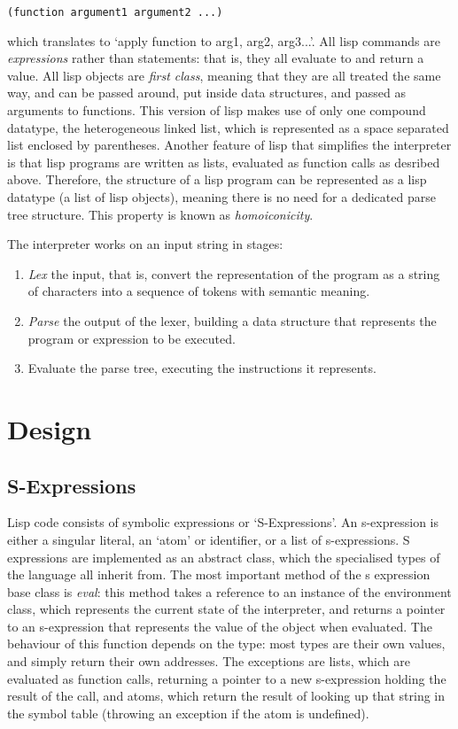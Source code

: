 \documentclass[12pt]{article}
\begin{document}
\begin{lstlisting}
(function argument1 argument2 ...)
\end{lstlisting}


which translates to `apply function to arg1, arg2, arg3...'. All lisp
commands are \textit{expressions} rather than statements: that is,
they all evaluate to and return a value. All lisp objects are
\textit{first class}, meaning that they are all treated the same way,
and can be passed around, put inside data structures, and passed as
arguments to functions. This version of lisp
makes use of only one compound datatype, the heterogeneous
linked list, which is represented as a space separated list enclosed
by parentheses. Another feature of lisp that simplifies the interpreter
is that lisp programs are written as lists, evaluated as function calls
as desribed above. Therefore, the structure of a lisp program can be 
represented as a lisp datatype (a list of lisp objects), meaning there
is no need for a dedicated parse tree structure. This property is known
as \textit{homoiconicity}.

The interpreter works on an input string in stages:
\begin{enumerate}
	\item \textit{Lex} the input, that is, convert the
	representation of the program as a string of characters into a
	sequence of tokens with semantic meaning. 
	\item \textit{Parse}
	the output of the lexer, building a data structure that represents
	the program or expression to be executed. 
	\item Evaluate the parse tree,
	executing the instructions it represents.
\end{enumerate}


\section{Design}
\subsection{S-Expressions}
\label{section:sexp}

Lisp code consists of symbolic expressions or `S-Expressions'. An
s-expression is either a singular literal, an `atom' or identifier, or
a list of s-expressions. S expressions are implemented as an abstract
class, which the specialised types of the language all inherit from.
The most important method of the s expression base class is
\textit{eval}: this method takes a reference to an instance of the
environment class, which represents the current state of the
interpreter, and returns a pointer to an s-expression that represents
the value of the object when evaluated. The behaviour of this function
depends on the type: most types are their own values, and simply
return their own addresses. The exceptions are lists,
which are evaluated as function calls, returning a pointer to a new
s-expression holding the result of the call, and atoms, which return
the result of looking up that string in the symbol table (throwing an
exception if the atom is undefined).
\end{document}
